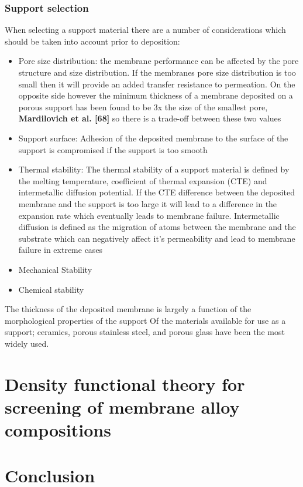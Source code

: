 \subsubsection{Support selection}
When selecting a support material there are a number of considerations which should be taken 
into account prior to deposition:
\begin{itemize}
\item Pore size distribution: the membrane performance can be affected by the pore structure 
and size distribution. If the membranes pore size distribution is too small then it will 
provide an added transfer resistance to permeation. On the opposite side however the minimum 
thickness of a membrane deposited on a porous support has been found to be 3x the size of the 
smallest pore, \textbf{Mardilovich et al. [68]}  so there is a trade-off between these two 
values
\item Support surface: Adhesion of the deposited membrane to the surface of the support is 
compromised if the support is too smooth
\item Thermal stability: The thermal stability of a support material is defined by the 
melting temperature, coefficient of thermal expansion (CTE) and intermetallic diffusion 
potential. If the CTE difference between the deposited membrane and the support is too large 
it will lead to a difference in the expansion rate which eventually leads to membrane failure. Intermetallic diffusion is defined as the migration of atoms between the membrane and the substrate which can negatively affect it’s permeability and lead to membrane failure in extreme cases
\item Mechanical Stability
\item Chemical stability
\end{itemize}
The thickness of the deposited membrane is largely a function of the morphological properties 
of the support 
Of the materials available for use as a support; ceramics, porous stainless steel, and porous 
glass have been the most widely used. 


\section{Density functional theory for screening of membrane alloy compositions}

\section{Conclusion}






